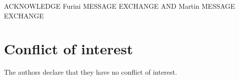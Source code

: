 \begin{comment}
\begin{align}
\mbox{max.} & \sum_{j \in \bar{J}} p_j y_j \label{eq:objfun}\\
\mbox{s.t.} & \specialcell{\sum_{o \in O}\sum_{q \in Q_{jo}} x^o_{qj} + y_j \leq \sum_{k \in J}\sum_{o \in O}\sum_{q \in Q_{ko}} a^o_{qkj} x^o_{qk} \hspace*{0.15\textwidth} \forall j \in \bar{J}, j \neq 0,}\label{eq:}\\
            & \specialcell{\sum_{o \in O}\sum_{q \in Q_{jo}} x^o_{qj} \leq \sum_{k \in J}\sum_{o \in O}\sum_{q \in Q_{ko}} a^o_{qkj} x^o_{qk} \hspace*{\fill} \forall j \in J\setminus\bar{J},}\label{eq:}\\
	    & \specialcell{\sum_{o \in O}\sum_{q \in Q_{0o}} x^o_{q0} + y_0 \leq 1 \hspace*{\fill} ,}\label{eq:}\\
            & \specialcell{y_j \leq u_j \hspace*{\fill} \forall j \in \bar{J},}\label{eq:}\\
	    & \specialcell{x^o_{qj} \in \mathbb{N}^0 \hspace*{\fill} \forall j \in J, o \in O, q \in Q_{jo},}\label{eq:}\\
            & \specialcell{y_j \in \mathbb{N}^0 \hspace*{\fill} \forall j \in \bar{J}.}\label{eq:}
\end{align}
\end{comment}

\begin{acknowledgements}
ACKNOWLEDGE Furini MESSAGE EXCHANGE AND Martin MESSAGE EXCHANGE
\end{acknowledgements}

%
\section*{Conflict of interest}
The authors declare that they have no conflict of interest.




